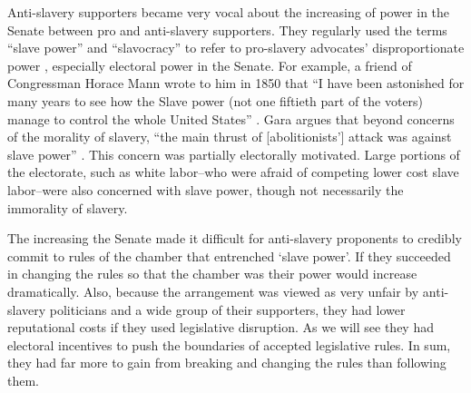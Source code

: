 \documentclass[a4paper]{article}\usepackage[]{graphicx}\usepackage[]{color}
\begin{document}
Anti-slavery supporters became very vocal about the increasing  of power in the Senate between pro and anti-slavery supporters. They regularly used the terms ``slave power'' and ``slavocracy'' to refer to pro-slavery advocates' disproportionate power \citep{richards2000}, especially electoral power in the Senate. For example, a friend of Congressman Horace Mann wrote to him in 1850 that ``I have been astonished for many years to see how the Slave power (not one fiftieth part of the voters) manage to control the whole United States'' \citep[quoted in][6]{Gara1969}. Gara argues that beyond concerns of the morality of slavery, ``the main thrust of [abolitionists'] attack was against slave power'' \citeyearpar[6]{Gara1969}. This concern was partially electorally motivated. Large portions of the electorate, such as white labor--who were afraid of competing lower cost slave labor--were also concerned with slave power, though not necessarily the immorality of slavery.

The increasing  the Senate made it difficult for anti-slavery proponents to credibly commit to rules of the chamber that entrenched `slave power'. If they succeeded in changing the rules so that the chamber was  their power would increase dramatically. Also, because the arrangement was viewed as very unfair by anti-slavery politicians and a wide group of their supporters, they had lower reputational costs if they used legislative disruption. As we will see they had electoral incentives to push the boundaries of accepted legislative rules. In sum, they had far more to gain from breaking and changing the rules than following them.
\end{document}

